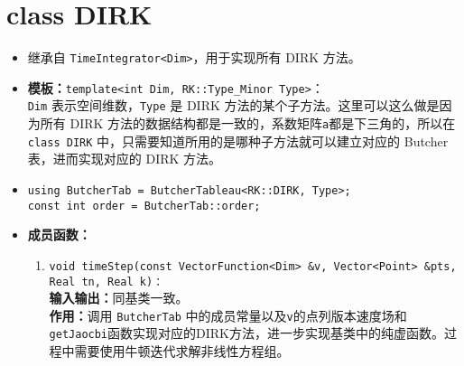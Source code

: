 \documentclass[a4paper,twoside]{ctexart}
\begin{document}
\section{class DIRK}
\begin{itemize}
    \item 继承自 \texttt{TimeIntegrator<Dim>}，用于实现所有 DIRK 方法。
    \item \textbf{模板：}\texttt{template<int Dim, RK::Type\_Minor Type>}：\\\texttt{Dim} 表示空间维数，\texttt{Type} 是 DIRK 方法的某个子方法。这里可以这么做是因为所有 DIRK 方法的数据结构都是一致的，系数矩阵\texttt{a}都是下三角的，所以在 \texttt{class DIRK} 中，只需要知道所用的是哪种子方法就可以建立对应的 Butcher 表，进而实现对应的 DIRK 方法。
    \item \texttt{using ButcherTab = ButcherTableau<RK::DIRK, Type>;\\
    const int order = ButcherTab::order;}
    \item \textbf{成员函数：}
            \begin{enumerate}[(1)]
                \item \texttt{void timeStep(const VectorFunction<Dim> \&v, Vector<Point> \&pts, Real tn, Real k)：}\\
                \textbf{输入输出：}同基类一致。\\
                \textbf{作用：}调用 \texttt{ButcherTab} 中的成员常量以及\texttt{v}的点列版本速度场和\texttt{getJaocbi}函数实现对应的DIRK方法，进一步实现基类中的纯虚函数。过程中需要使用牛顿迭代求解非线性方程组。
            \end{enumerate}
\end{itemize}
\end{document}
